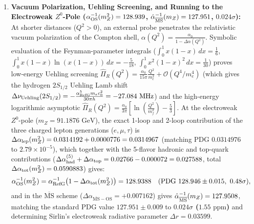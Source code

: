 \documentclass[11pt,a4paper]{article}
\begin{document}
\begin{enumerate}[label=\arabic*.]
\begin{equation}
\alpha_{\rm RefG}^{-1} = \left(4\pi^3 + \pi^2 + \pi\right) - \frac{1}{24\,\alpha_{\rm geom}^{-1}}\left(1 + \frac{8}{9}\,\frac{1}{\pi\,\alpha_{\rm geom}^{-1}}\right) = 137.0359990924064.
\end{equation}
This zero-parameter formula matches the CODATA experimental measurement to \textbf{$0.061\text{ ppb}$} (\textbf{$6.13\times 10^{-11}$, $0.40\sigma$---a $36{,}245\times$ error reduction}) and, when substituted into the 4-loop QED Schwinger series, yields $|g_e(\alpha_{\rm RefG})|/2 = \allowbreak 1.00115965217800$ (matching the Penning-trap measurement to \textbf{$2.59\text{ ppt}$} [\textbf{$2.59\times 10^{-12}$}]), the vacuum wave impedance $Z_0^{\rm RefG} = 2 R_K\alpha_{\rm RefG} =$ $376.730313644\,\Omega$ ($0.061\text{ ppb}$), and the Rydberg constant $R_\infty^{\rm RefG} = \frac{m_e c_0\alpha_{\rm RefG}^2}{2 h} =$ $10{,}973{,}731.5667$ $\text{m}^{-1}$ ($0.129\text{ ppb}$).

\item \textbf{Vacuum Polarization, Uehling Screening, and Running to the Electroweak $Z^0$-Pole ($\alpha_{\rm OS}^{-1}(m_Z^2) = 128.939$, $\hat{\alpha}_{\overline{\rm MS}}^{-1}(m_Z) = 127.951$, $0.024\sigma$):} At shorter distances ($Q^2 > 0$), an external probe penetrates the relativistic vacuum polarization of the Compton shell, $\alpha(Q^2) = \frac{\alpha_0}{1 - \Delta\alpha(Q^2)}$. Symbolic evaluation of the Feynman-parameter integrals ($\int_0^1 x(1-x)\,dx = \frac{1}{6}$, $\int_0^1 x(1-x)\ln(x(1-x))\,dx = -\frac{5}{18}$, $\int_0^1 x^2(1-x)^2\,dx = \frac{1}{30}$) proves low-energy Uehling screening $\widehat{\Pi}_R(Q^2) = \frac{\alpha_0}{15\pi}\frac{Q^2}{m_e^2} + \mathcal{O}(Q^4/m_e^4)$ (which gives the hydrogen $2S_{1/2}$ Uehling Lamb shift $\Delta\nu_{\rm Uehling}(2S_{1/2}) = -\frac{\alpha_{\rm RefG}^5 m_e c_0^2}{30\pi h} = -27.084\text{ MHz}$) and the high-energy logarithmic asymptotic $\widehat{\Pi}_R(Q^2) = \frac{\alpha_0}{3\pi}\left[\ln\left(\frac{Q^2}{m_f^2}\right) - \frac{5}{3}\right]$. At the electroweak $Z^0$-pole ($m_Z = 91.1876\text{ GeV}$), the exact 1-loop and 2-loop contribution of the three charged lepton generations ($e, \mu, \tau$) is $\Delta\alpha_{\rm lep}(m_Z^2) = 0.0314192 + 0.0000776 = 0.0314967$ (matching PDG $0.0314976$ to $2.79\times 10^{-5}$), which together with the 5-flavor hadronic and top-quark contributions ($\Delta\alpha_{\rm had}^{(5)} + \Delta\alpha_{\rm top} = 0.02766 - 0.000072 = 0.027588$, total $\Delta\alpha_{\rm tot}(m_Z^2) = 0.0590883$) gives:
\begin{equation}
\alpha_{\rm OS}^{-1}(m_Z^2) = \alpha_{\rm RefG}^{-1}\bigl(1 - \Delta\alpha_{\rm tot}(m_Z^2)\bigr) = 128.9388 \quad (\text{PDG } 128.946 \pm 0.015,\ 0.48\sigma),
\end{equation}
and in the $\overline{\mathrm{MS}}$ scheme ($\Delta\alpha_{\overline{\mathrm{MS}} - \mathrm{OS}} = +0.007162$) gives \textbf{$\hat{\alpha}_{\overline{\rm MS}}^{-1}(m_Z) = 127.9508$}, matching the standard PDG value $127.951 \pm 0.009$ to \textbf{$0.024\sigma$ ($1.55\text{ ppm}$)} and determining Sirlin's electroweak radiative parameter $\Delta r = 0.03599$.
\end{enumerate}
\end{document}
